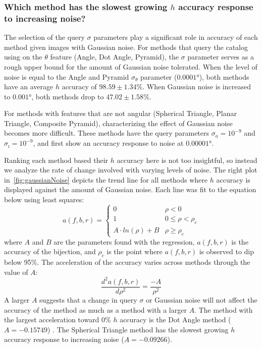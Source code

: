 \subsubsection{Which method has the slowest growing $h$ accuracy response to increasing noise?}
The selection of the query $\sigma$ parameters play a significant role in accuracy of each method given images with
Gaussian noise.
For methods that query the catalog using on the $\theta$ feature (Angle, Dot Angle, Pyramid), the $\sigma$ parameter
serves as a rough upper bound for the amount of Gaussian noise tolerated.
When the level of noise is equal to the Angle and Pyramid $\sigma_\theta$ parameter ($\ang{0.0001}$),
both methods have an average $h$ accuracy of $98.59 \pm 1.34\%$.
When Gaussian noise is increased to $\ang{0.001}$, both methods drop to $47.02 \pm 1.58\%$.

For methods with features that are not angular (Spherical Triangle, Planar Triangle, Composite Pyramid),
characterizing the effect of Gaussian noise becomes more difficult.
These methods have the query parameters $\sigma_a = 10^{-9}$ and $\sigma_\imath = 10^{-9}$, and first show an
accuracy response to noise at $\ang{0.00001}$.

Ranking each method based their $h$ accuracy here is not too insightful, so instead we analyze the rate of change
involved with varying levels of noise.
The right plot in~\autoref{fig:gaussianNoise} depicts the trend line for all methods where $h$ accuracy is displayed
against the amount of Gaussian noise.
Each line was fit to the equation below using least squares:
\begin{equation}
    a(f, b, r) =
    \begin{cases}
        0 & \rho < 0 \\
        1 & 0 \leq \rho < \rho_c \\
        A \cdot \mathit{ln}(\rho) + B & \rho \geq \rho_c
    \end{cases}
\end{equation}
where $A$ and $B$ are the parameters found with the regression, $a(f, b, r)$ is the accuracy of the bijection, and
$\rho_c$ is the point where $a(f, b, r)$ is observed to dip below 95\%.
The acceleration of the accuracy varies across methods through the value of $A$:
\begin{equation}
    \frac{d^{2}a(f, b, r)}{d\rho^2} = \frac{-A}{\rho^2}
\end{equation}
A larger $A$ suggests that a change in query $\sigma$ or Gaussian noise will not affect the accuracy of the method
as much as a method with a larger $A$.
The method with the largest acceleration toward $0\%$ $h$ accuracy is the Dot Angle method ($A = -0.15749$) .
The Spherical Triangle method has the slowest growing $h$ accuracy response to increasing noise ($A = -0.09266$).

